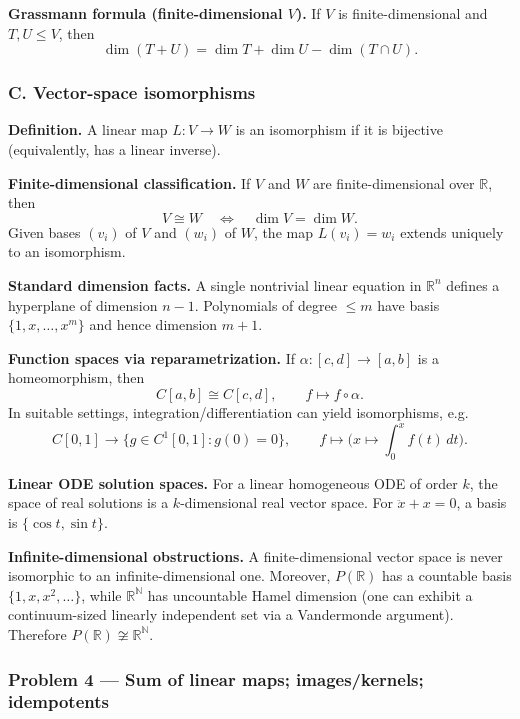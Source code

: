 \documentclass[12pt,a4paper]{article}
\theoremstyle{plain}
\theoremstyle{definition}      %
\begin{document}
\medskip
\noindent\textbf{Grassmann formula (finite-dimensional $V$).}
If $V$ is finite-dimensional and $T,U\le V$, then
\[
\dim(T+U)=\dim T+\dim U-\dim(T\cap U).
\]

\bigskip

\subsubsection*{C. Vector-space isomorphisms}

\noindent\textbf{Definition.}
A linear map $L:V\to W$ is an isomorphism if it is bijective (equivalently, has a linear inverse).

\medskip
\noindent\textbf{Finite-dimensional classification.}
If $V$ and $W$ are finite-dimensional over $\mathbb R$, then
\[
V\cong W \quad\Longleftrightarrow\quad \dim V=\dim W.
\]
Given bases $(v_i)$ of $V$ and $(w_i)$ of $W$, the map $L(v_i)=w_i$ extends uniquely to an isomorphism.

\medskip
\noindent\textbf{Standard dimension facts.}
A single nontrivial linear equation in $\mathbb R^n$ defines a hyperplane of dimension $n-1$.
Polynomials of degree $\le m$ have basis $\{1,x,\dots,x^m\}$ and hence dimension $m+1$.

\medskip
\noindent\textbf{Function spaces via reparametrization.}
If $\alpha:[c,d]\to[a,b]$ is a homeomorphism, then
\[
C[a,b]\cong C[c,d],\qquad f\mapsto f\circ \alpha.
\]
In suitable settings, integration/differentiation can yield isomorphisms, e.g.
\[
C[0,1]\to \{g\in C^1[0,1]:g(0)=0\},\qquad f\mapsto\Big(x\mapsto\int_0^x f(t)\,dt\Big).
\]

\medskip
\noindent\textbf{Linear ODE solution spaces.}
For a linear homogeneous ODE of order $k$, the space of real solutions is a $k$-dimensional real vector space.
For $\ddot x + x=0$, a basis is $\{\cos t,\sin t\}$.

\medskip
\noindent\textbf{Infinite-dimensional obstructions.}
A finite-dimensional vector space is never isomorphic to an infinite-dimensional one.
Moreover, $P(\mathbb R)$ has a countable basis $\{1,x,x^2,\dots\}$, while $\mathbb R^{\mathbb N}$ has uncountable
Hamel dimension (one can exhibit a continuum-sized linearly independent set via a Vandermonde argument).
Therefore $P(\mathbb R)\not\cong \mathbb R^{\mathbb N}$.


\subsubsection*{Problem 4 — Sum of linear maps; images/kernels; idempotents}
\end{document}
